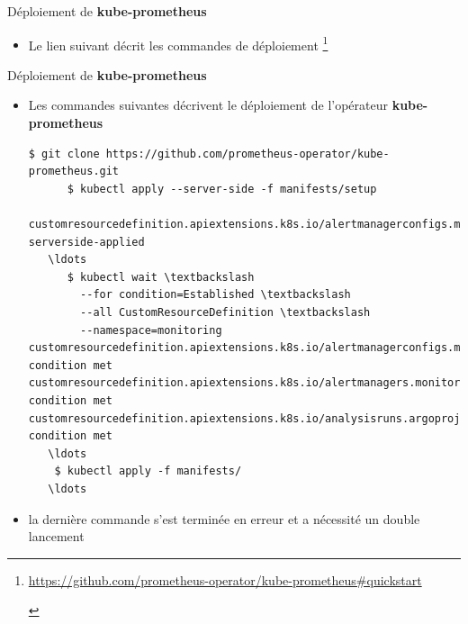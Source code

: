 
\begin{frame}[fragile]{Déploiement de \textbf{kube-prometheus}}

\begin{itemize}
   \item Le lien suivant décrit les commandes de déploiement \footnote{
         \begin{tcolorbox}
         \tiny{\url{https://github.com/prometheus-operator/kube-prometheus\#quickstart}}
         \end{tcolorbox}
      }
\end{itemize}

\end{frame}


\begin{frame}[fragile]{Déploiement de \textbf{kube-prometheus}}

\begin{itemize}
   \item Les commandes suivantes décrivent le déploiement de l'opérateur \textbf{kube-prometheus}
   \begin{tiny}
      \begin{Verbatim}[commandchars=\\\#\#]
      $ git clone https://github.com/prometheus-operator/kube-prometheus.git
      $ kubectl apply --server-side -f manifests/setup
   customresourcedefinition.apiextensions.k8s.io/alertmanagerconfigs.monitoring.coreos.com serverside-applied
   \ldots
      $ kubectl wait \textbackslash
        --for condition=Established \textbackslash
        --all CustomResourceDefinition \textbackslash
        --namespace=monitoring
customresourcedefinition.apiextensions.k8s.io/alertmanagerconfigs.monitoring.coreos.com condition met
customresourcedefinition.apiextensions.k8s.io/alertmanagers.monitoring.coreos.com condition met
customresourcedefinition.apiextensions.k8s.io/analysisruns.argoproj.io condition met
   \ldots
    $ kubectl apply -f manifests/
   \ldots
   \end{Verbatim}
   \end{tiny}
   \item la dernière commande s'est terminée en erreur et a nécessité un double lancement
\end{itemize}

\end{frame}

